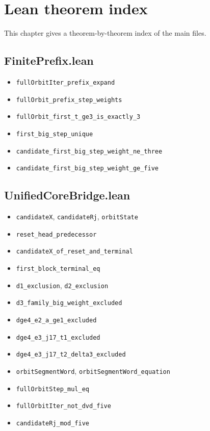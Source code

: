 \section{Lean theorem index}

This chapter gives a theorem-by-theorem index of the main files.

\subsection{FinitePrefix.lean}

\begin{itemize}[leftmargin=*]
\item \texttt{fullOrbitIter\_prefix\_expand}
\item \texttt{fullOrbit\_prefix\_step\_weights}
\item \texttt{fullOrbit\_first\_t\_ge3\_is\_exactly\_3}
\item \texttt{first\_big\_step\_unique}
\item \texttt{candidate\_first\_big\_step\_weight\_ne\_three}
\item \texttt{candidate\_first\_big\_step\_weight\_ge\_five}
\end{itemize}

\subsection{UnifiedCoreBridge.lean}

\begin{itemize}[leftmargin=*]
\item \texttt{candidateX}, \texttt{candidateRj}, \texttt{orbitState}
\item \texttt{reset\_head\_predecessor}
\item \texttt{candidateX\_of\_reset\_and\_terminal}
\item \texttt{first\_block\_terminal\_eq}
\item \texttt{d1\_exclusion}, \texttt{d2\_exclusion}
\item \texttt{d3\_family\_big\_weight\_excluded}
\item \texttt{dge4\_e2\_a\_ge1\_excluded}
\item \texttt{dge4\_e3\_j17\_t1\_excluded}
\item \texttt{dge4\_e3\_j17\_t2\_delta3\_excluded}
\item \texttt{orbitSegmentWord}, \texttt{orbitSegmentWord\_equation}
\item \texttt{fullOrbitStep\_mul\_eq}
\item \texttt{fullOrbitIter\_not\_dvd\_five}
\item \texttt{candidateRj\_mod\_five}
\end{itemize}

